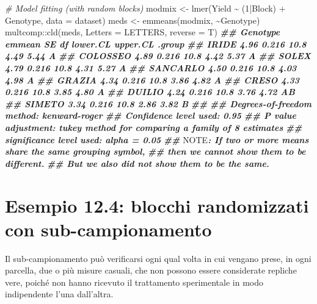 \documentclass[
  12pt,
]{book}
\newenvironment{Shaded}{\begin{snugshade}}{\end{snugshade}}
\newcommand{\AlertTok}[1]{\textcolor[rgb]{0.94,0.16,0.16}{#1}}
\newcommand{\AttributeTok}[1]{\textcolor[rgb]{0.77,0.63,0.00}{#1}}
\newcommand{\CommentTok}[1]{\textcolor[rgb]{0.56,0.35,0.01}{\textit{#1}}}
\newcommand{\DecValTok}[1]{\textcolor[rgb]{0.00,0.00,0.81}{#1}}
\newcommand{\DocumentationTok}[1]{\textcolor[rgb]{0.56,0.35,0.01}{\textbf{\textit{#1}}}}
\newcommand{\FunctionTok}[1]{\textcolor[rgb]{0.00,0.00,0.00}{#1}}
\newcommand{\NormalTok}[1]{#1}
\newcommand{\OtherTok}[1]{\textcolor[rgb]{0.56,0.35,0.01}{#1}}
\newcommand{\SpecialCharTok}[1]{\textcolor[rgb]{0.00,0.00,0.00}{#1}}
\begin{document}
\begin{Shaded}
\begin{Highlighting}[]
\CommentTok{\# Model fitting (with random blocks)}
\NormalTok{modmix }\OtherTok{\textless{}{-}} \FunctionTok{lmer}\NormalTok{(Yield }\SpecialCharTok{\textasciitilde{}}\NormalTok{ (}\DecValTok{1}\SpecialCharTok{|}\NormalTok{Block) }\SpecialCharTok{+}\NormalTok{ Genotype, }\AttributeTok{data =}\NormalTok{ dataset)}
\NormalTok{meds }\OtherTok{\textless{}{-}} \FunctionTok{emmeans}\NormalTok{(modmix, }\SpecialCharTok{\textasciitilde{}}\NormalTok{Genotype)}
\NormalTok{multcomp}\SpecialCharTok{::}\FunctionTok{cld}\NormalTok{(meds, }\AttributeTok{Letters =}\NormalTok{ LETTERS, }\AttributeTok{reverse =}\NormalTok{ T)}
\DocumentationTok{\#\#  Genotype emmean    SE   df lower.CL upper.CL .group}
\DocumentationTok{\#\#  IRIDE      4.96 0.216 10.8     4.49     5.44  A    }
\DocumentationTok{\#\#  COLOSSEO   4.89 0.216 10.8     4.42     5.37  A    }
\DocumentationTok{\#\#  SOLEX      4.79 0.216 10.8     4.31     5.27  A    }
\DocumentationTok{\#\#  SANCARLO   4.50 0.216 10.8     4.03     4.98  A    }
\DocumentationTok{\#\#  GRAZIA     4.34 0.216 10.8     3.86     4.82  A    }
\DocumentationTok{\#\#  CRESO      4.33 0.216 10.8     3.85     4.80  A    }
\DocumentationTok{\#\#  DUILIO     4.24 0.216 10.8     3.76     4.72  AB   }
\DocumentationTok{\#\#  SIMETO     3.34 0.216 10.8     2.86     3.82   B   }
\DocumentationTok{\#\# }
\DocumentationTok{\#\# Degrees{-}of{-}freedom method: kenward{-}roger }
\DocumentationTok{\#\# Confidence level used: 0.95 }
\DocumentationTok{\#\# P value adjustment: tukey method for comparing a family of 8 estimates }
\DocumentationTok{\#\# significance level used: alpha = 0.05 }
\DocumentationTok{\#\# }\AlertTok{NOTE}\DocumentationTok{: If two or more means share the same grouping symbol,}
\DocumentationTok{\#\#       then we cannot show them to be different.}
\DocumentationTok{\#\#       But we also did not show them to be the same.}
\end{Highlighting}
\end{Shaded}

\hypertarget{esempio-12.4-blocchi-randomizzati-con-sub-campionamento}{%
\section{Esempio 12.4: blocchi randomizzati con sub-campionamento}\label{esempio-12.4-blocchi-randomizzati-con-sub-campionamento}}

Il sub-campionamento può verificarsi ogni qual volta in cui vengano prese, in ogni parcella, due o più misure casuali, che non possono essere considerate repliche vere, poiché non hanno ricevuto il trattamento sperimentale in modo indipendente l'una dall'altra.
\end{document}
